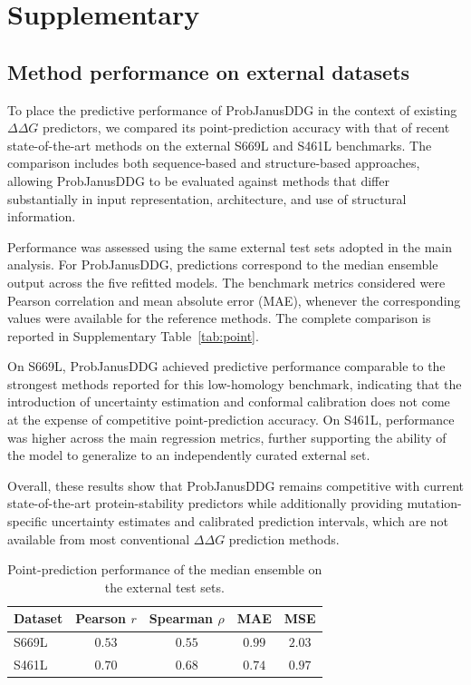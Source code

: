 \documentclass[11pt]{article}
\begin{document}
\clearpage
\appendix
\onecolumn

\section{Supplementary}

\subsection{Method performance on external datasets}
\label{app:performance}


To place the predictive performance of ProbJanusDDG in the context of existing
$\Delta\Delta G$ predictors, we compared its point-prediction accuracy with that of
recent state-of-the-art methods on the external S669L and S461L benchmarks. The
comparison includes both sequence-based and structure-based approaches, allowing
ProbJanusDDG to be evaluated against methods that differ substantially in input
representation, architecture, and use of structural information.

Performance was assessed using the same external test sets adopted in the main
analysis. For ProbJanusDDG, predictions correspond to the median ensemble output
across the five refitted models. The benchmark metrics considered were Pearson
correlation and mean absolute error (MAE), whenever the corresponding values were available for the reference
methods. The complete comparison is reported in Supplementary
Table~\ref{tab:point}.

On S669L, ProbJanusDDG achieved predictive performance comparable to the strongest
methods reported for this low-homology benchmark, indicating that the introduction
of uncertainty estimation and conformal calibration does not come at the expense of
competitive point-prediction accuracy. On S461L, performance was higher across the
main regression metrics, further supporting the ability of the model to generalize
to an independently curated external set.

Overall, these results show that ProbJanusDDG remains competitive with current
state-of-the-art protein-stability predictors while additionally providing
mutation-specific uncertainty estimates and calibrated prediction intervals, which
are not available from most conventional $\Delta\Delta G$ prediction methods.




\begin{table}[h]
\centering
\caption{Point-prediction performance of the median ensemble on the external test sets.}
\label{tab:point_prediction_performance}
\small
\begin{tabular}{lcccc}
\toprule
Dataset & Pearson $r$ & Spearman $\rho$ & MAE & MSE \\
\midrule
S669L & $0.53$ & $0.55$ & $0.99$ & $2.03$ \\
S461L & $0.70$ & $0.68$ & $0.74$ & $0.97$ \\
\bottomrule
\end{tabular}
\vspace{2pt}

\end{table}
\end{document}
